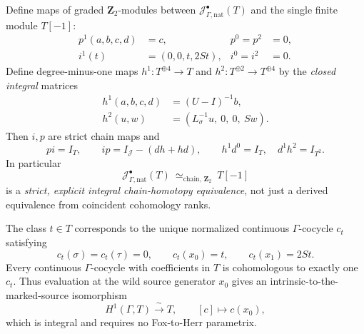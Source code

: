 \begin{theorem}
\label{thm:dyadic-s3-natural-strict-retract}
Define maps of graded
$\mathbf Z_2$-modules between
$\mathcal J^\bullet_{\Gamma,\mathrm{nat}}(T)$
and the single finite module
$T[-1]$:
\begin{equation}\label{eq:dyadic-s3-natural-pi-maps}
\begin{aligned}
p^1(a,b,c,d)&=c,
 &p^0=p^2&=0,\\
i^1(t)&=(0,0,t,2St),
 &i^0=i^2&=0.
\end{aligned}
\end{equation}
Define degree-minus-one
maps $h^1:T^{\oplus4}\to T$ and
$h^2:T^{\oplus2}\to T^{\oplus4}$
by the \emph{closed integral}
matrices
\begin{equation}\label{eq:dyadic-s3-natural-explicit-homotopy}
\boxed{
\begin{aligned}
h^1(a,b,c,d)&=(U-I)^{-1}b,
\\
h^2(u,w)&=(L_\sigma^{-1}u,\ 0,\ 0,\ Sw).
\end{aligned}}
\end{equation}
Then $i,p$ are strict chain
maps and
\begin{equation}\label{eq:dyadic-s3-natural-contraction-identities}
\boxed{\qquad
p i=I_T,\qquad
i p=I_{\mathcal J}-(d h+h d),
\qquad
h^1d^0=I_T,\quad d^1h^2=I_{T^2}.
\qquad}
\end{equation}
In particular
\begin{equation}\label{eq:dyadic-s3-natural-complex-retract}
\mathcal J^\bullet_{\Gamma,\mathrm{nat}}(T)
\ \simeq_{\mathrm{chain},\,\mathbf Z_2}\
T[-1]
\end{equation}
is a \emph{strict, explicit
integral chain-homotopy equivalence},
not just a derived equivalence
from coincident cohomology ranks.

The class $t\in T$ corresponds
to the unique normalized continuous
$\Gamma$-cocycle $c_t$ satisfying
\begin{equation}\label{eq:dyadic-s3-natural-normalized-cocycle}
\boxed{
c_t(\sigma)=c_t(\tau)=0,\qquad
c_t(x_0)=t,\qquad
c_t(x_1)=2St.
}
\end{equation}
Every continuous $\Gamma$-cocycle
with coefficients in $T$ is
cohomologous to exactly one
$c_t$.  Thus evaluation at the
wild source generator $x_0$
gives an intrinsic-to-the-marked-source
isomorphism
\begin{equation}\label{eq:dyadic-s3-natural-cohom-coordinate}
H^1(\Gamma,T)\xrightarrow{\;\sim\;}T,
\qquad[c]\longmapsto c(x_0),
\end{equation}
which is integral and requires
no Fox-to-Herr parametrix.
\end{theorem}

